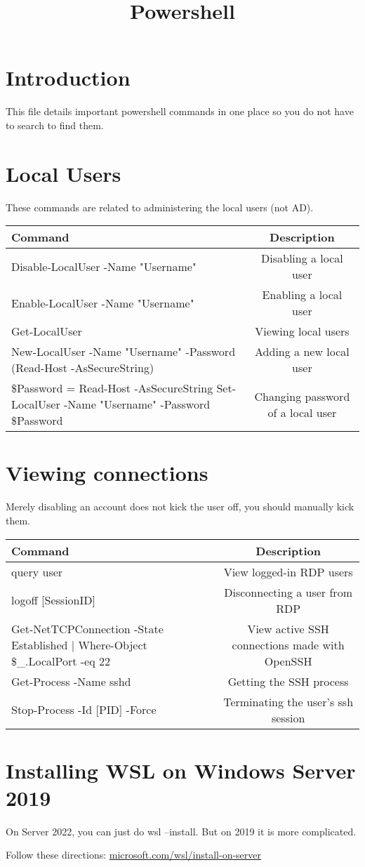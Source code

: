 \documentclass{article}
\begin{document}
\title{Powershell}

\graphicspath{ {./Images/} }
\tableofcontents

\section{Introduction}
This file details important powershell commands in one place so you do not have to search to find them.

\section{Local Users}
These commands are related to administering the local users (not AD).

\begin{table}[h]
\centering
\begin{tabular}{| m{20em} |c|} %
Command & Description \\
\hline
Disable-LocalUser -Name "Username" & Disabling a local user \\
Enable-LocalUser -Name "Username" & Enabling a local user \\
Get-LocalUser & Viewing local users \\
New-LocalUser -Name "Username" 
-Password (Read-Host -AsSecureString) & Adding a new local user \\
\$Password = Read-Host -AsSecureString
Set-LocalUser -Name "Username" -Password \$Password & Changing password of a local user \\
\hline
\end{tabular}
\end{table}

\section{Viewing connections}
Merely disabling an account does not kick the user off, you should manually kick them.

\begin{table}[h]
\centering
\begin{tabular}{| m{20em} |c|} %
Command & Description \\
\hline
query user & View logged-in RDP users \\
logoff [SessionID] & Disconnecting a user from RDP \\
Get-NetTCPConnection -State Established | 
Where-Object { \$\_.LocalPort -eq 22 } & View active SSH connections made with OpenSSH \\
Get-Process -Name sshd & Getting the SSH process \\
Stop-Process -Id [PID] -Force & Terminating the user's ssh session \\
\hline
\end{tabular}
\end{table}

\section{Installing WSL on Windows Server 2019}
On Server 2022, you can just do wsl --install. But on 2019 it is more complicated. 

Follow these directions: \href{https://learn.microsoft.com/en-us/windows/wsl/install-on-server}{microsoft.com/wsl/install-on-server}
\end{document}

